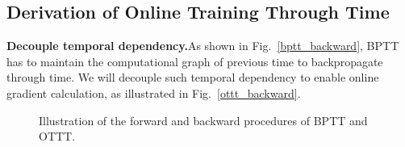 \documentclass{article}
\begin{document}
\subsection{Derivation of Online Training Through Time}\label{derivation of ottt}
\vspace{-2mm}

\textbf{Decouple temporal dependency.}\quad As shown in Fig.~\ref{bptt_backward}, BPTT has to maintain the computational graph of previous time to backpropagate through time. We will decouple such temporal dependency to enable online gradient calculation, as illustrated in Fig.~\ref{ottt_backward}. 

\begin{figure}
    \centering
    \caption{Illustration of the forward and backward procedures of BPTT and OTTT.}
    \label{fig:illustration}
\vspace{-2mm}
\end{figure}
\end{document}
